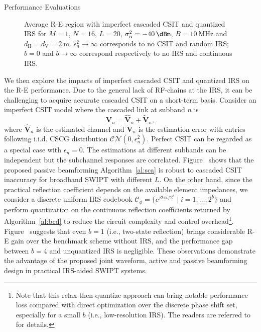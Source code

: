 \documentclass[journal]{IEEEtran}
\begin{document}
\begin{section}{Performance Evaluations}
		\begin{figure}[!t]
			\centering
			\caption{Average R-E region with imperfect cascaded CSIT and quantized IRS for $M=1$, $N=16$, $L=20$, $\sigma_n^2=\SI{-40}{\dBm}$, $B=\SI{10}{\MHz}$ and $d_{\mathrm{H}}=d_{\mathrm{V}}=\SI{2}{\meter}$. $\epsilon_n^2 \to \infty$ corresponds to no CSIT and random IRS; $b=0$ and $b \to \infty$ correspond respectively to no IRS and continuous IRS.}
		\end{figure}

		We then explore the impacts of imperfect cascaded CSIT and quantized IRS on the R-E performance. Due to the general lack of RF-chains at the IRS, it can be challenging to acquire accurate cascaded CSIT on a short-term basis. Consider an imperfect CSIT model where the cascaded link at subband $n$ is
		\begin{equation}
			\boldsymbol{V}_{n} = \hat{\boldsymbol{V}}_{n} + \tilde{\boldsymbol{V}}_{n},
		\end{equation}
		where $\hat{\boldsymbol{V}}_{n}$ is the estimated channel and $\tilde{\boldsymbol{V}}_{n}$ is the estimation error with entries following i.i.d. CSCG distribution $\mathcal{CN}(0, \epsilon_{n}^2)$. Perfect CSIT can be regarded as a special case with $\epsilon_{n}=0$. The estimations at different subbands can be independent but the subchannel responses are correlated. Figure~ shows that the proposed passive beamforming Algorithm~\ref{al:sca} is robust to cascaded CSIT inaccuracy for broadband SWIPT with different $L$. On the other hand, since the practical reflection coefficient depends on the available element impedances, we consider a discrete uniform IRS codebook $\mathcal{C}_\phi = \{e^{j 2 \pi i / 2^b} \mid i = 1, \dots, 2^b\}$ and perform quantization on the continuous reflection coefficients returned by Algorithm~\ref{al:bcd} to reduce the circuit complexity and control overhead\footnote{Note that this relax-then-quantize approach can bring notable performance loss compared with direct optimization over the discrete phase shift set, especially for a small $b$ (i.e., low-resolution IRS). The readers are referred to \cite{Wu2020c} for details.}. Figure~ suggests that even $b=1$ (i.e., two-state reflection) brings considerable R-E gain over the benchmark scheme without IRS, and the performance gap between $b=4$ and unquantized IRS is negligible. These observations demonstrate the advantage of the proposed joint waveform, active and passive beamforming design in practical IRS-aided SWIPT systems.
	\end{section}
\end{document}
